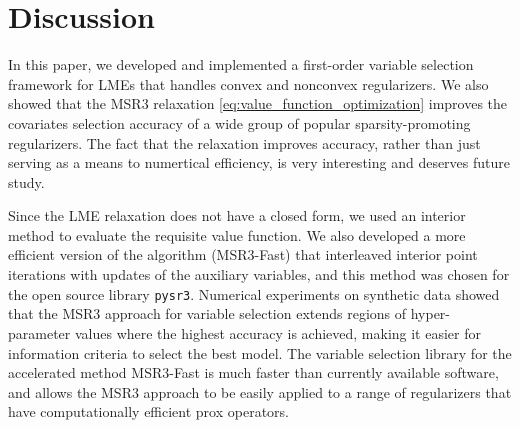     





\section{Discussion}
\label{sec:discussion}

    In this paper, we developed and implemented a first-order variable selection framework for LMEs that handles convex and nonconvex regularizers. We also showed that 
    the MSR3 relaxation \eqref{eq:value_function_optimization} 
improves the covariates selection accuracy of a wide group of popular sparsity-promoting regularizers. The fact that the relaxation improves accuracy, rather than just serving as a means to {numertical efficiency, %
     is very interesting and deserves future study.} %
    
    Since the LME relaxation does not have a closed form, we used an interior method to evaluate the requisite value function. We also developed 
    a more efficient version of the algorithm  (MSR3-Fast) that interleaved interior point iterations with updates of the auxiliary variables, and this method was chosen for the 
    open source library \texttt{pysr3}. %
{ Numerical experiments on synthetic data showed that the MSR3 approach for variable selection extends regions of hyper-parameter values where the highest accuracy is achieved, making it easier for information criteria to select the best model.} 
 The variable selection library for the accelerated method MSR3-Fast is much faster than currently available software, and allows the MSR3 approach to be easily applied to a range of regularizers that have 
{computationally efficient prox operators.} %

